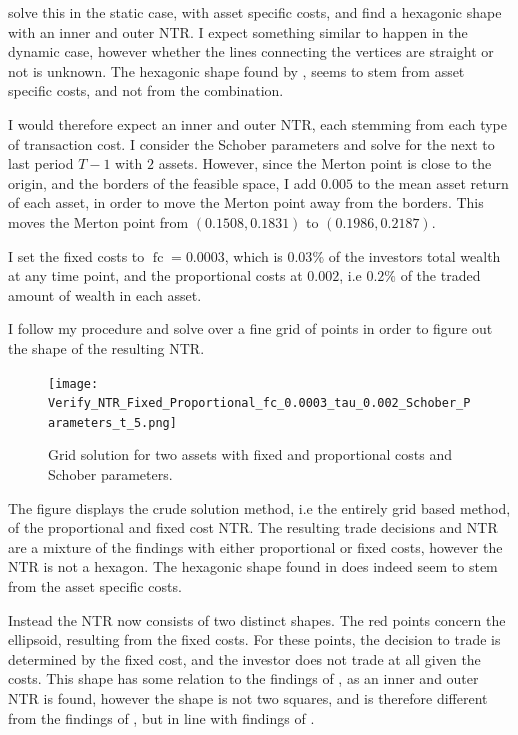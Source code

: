 \documentclass[11pt]{article}
\begin{document}
\autocite{Dybvig2020} solve this in the static case, with asset specific costs, and find a hexagonic shape with an inner and outer NTR.
I expect something similar to happen in the dynamic case, however whether the lines connecting the vertices are straight or not is unknown.
The hexagonic shape found by \autocite{Dybvig2020}, seems to stem from asset specific costs, and not from the combination.

I would therefore expect an inner and outer NTR, each stemming from each type of transaction cost.
I consider the Schober parameters and solve for the next to last period $T-1$ with $2$ assets.
However, since the Merton point is close to the origin, and the borders of the feasible space, 
I add $0.005$ to the mean asset return of each asset, in order to move the Merton point away from the borders.
This moves the Merton point from $(0.1508, 0.1831)$ to $(0.1986, 0.2187)$.

I set the fixed costs to $\operatorname{fc} =0.0003$, which is $0.03\%$ of the investors total wealth at any time point,
and the proportional costs at $0.002$, i.e $0.2\%$ of the traded amount of wealth in each asset.

I follow my procedure and solve over a fine grid of points in order to figure out the shape of the resulting \ac{NTR}.
\begin{figure}[!ht]
    \centering
    \texttt{[image: Verify\_NTR\_Fixed\_Proportional\_fc\_0.0003\_tau\_0.002\_Schober\_Parameters\_t\_5.png]}
    \caption{Grid solution for two assets with fixed and proportional costs and Schober parameters.}
    \label{fig: Final_NTR_Fixed_Proportional}
\end{figure}

The figure displays the crude solution method, i.e the entirely grid based method, of the proportional and fixed cost NTR.
The resulting trade decisions and \ac{NTR} are a mixture of the findings with either proportional or fixed costs, however the NTR is not a hexagon.
The hexagonic shape found in \autocite{Dybvig2020} does indeed seem to stem from the asset specific costs.

Instead the \ac{NTR} now consists of two distinct shapes. The red points concern the ellipsoid, resulting from the fixed costs.
For these points, the decision to trade is determined by the fixed cost, and the investor does not trade at all given the costs.
This shape has some relation to the findings of \autocite{liu2002}, as an inner and outer NTR is found, however the shape is not two squares,
and is therefore different from the findings of \autocite{liu2002}, but in line with findings of \autocite{Dybvig2020}.
\end{document}
